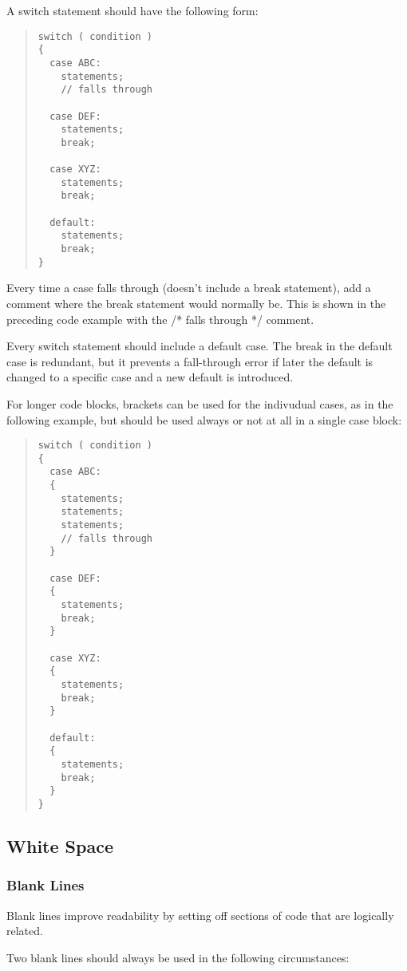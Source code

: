 \documentclass{article}
\begin{document}
A switch statement should have the following form: 

\begin{quote}
\begin{verbatim}
switch ( condition ) 
{
  case ABC:
    statements;
    // falls through

  case DEF:
    statements;
    break;

  case XYZ:
    statements;
    break;

  default:
    statements;
    break;
}
\end{verbatim}
\end{quote}

Every time a case falls through (doesn't include a break statement),
add a comment where the break statement would normally be. This is
shown in the preceding code example with the /* falls through */
comment.

Every switch statement should include a default case. The break in the
default case is redundant, but it prevents a fall-through error if
later the default is changed to a specific case and a new default is
introduced.

For longer code blocks, brackets can be used for the indivudual cases,
as in the following example, but should be used always or not at all
in a single case block:

\begin{quote}
\begin{verbatim}
switch ( condition ) 
{
  case ABC:
  {
    statements;
    statements;
    statements;
    // falls through
  }

  case DEF:
  {
    statements;
    break;
  }

  case XYZ:
  {
    statements;
    break;
  }

  default:
  {
    statements;
    break;
  }
}
\end{verbatim}
\end{quote}
\subsection{White Space}

\subsubsection{Blank Lines}

Blank lines improve readability by setting off sections of code that
are logically related. 

Two blank lines should always be used in the following circumstances: 
\end{document}

